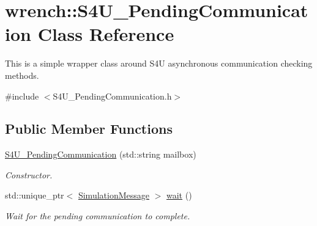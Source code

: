 \hypertarget{classwrench_1_1_s4_u___pending_communication}{}\section{wrench\+:\+:S4\+U\+\_\+\+Pending\+Communication Class Reference}
\label{classwrench_1_1_s4_u___pending_communication}


This is a simple wrapper class around S4U asynchronous communication checking methods.  




{\ttfamily \#include $<$S4\+U\+\_\+\+Pending\+Communication.\+h$>$}

\subsection*{Public Member Functions}
\begin{DoxyCompactItemize}
\item 
\hyperlink{classwrench_1_1_s4_u___pending_communication_afd1c2260a72a827992f883386b9b2df6}{S4\+U\+\_\+\+Pending\+Communication} (std\+::string mailbox)
\begin{DoxyCompactList}\small\item\em Constructor. \end{DoxyCompactList}\item 
std\+::unique\+\_\+ptr$<$ \hyperlink{classwrench_1_1_simulation_message}{Simulation\+Message} $>$ \hyperlink{classwrench_1_1_s4_u___pending_communication_ae50dec7ef82e3a95eb2961591b40c583}{wait} ()
\begin{DoxyCompactList}\small\item\em Wait for the pending communication to complete. \end{DoxyCompactList}\end{DoxyCompactItemize}
